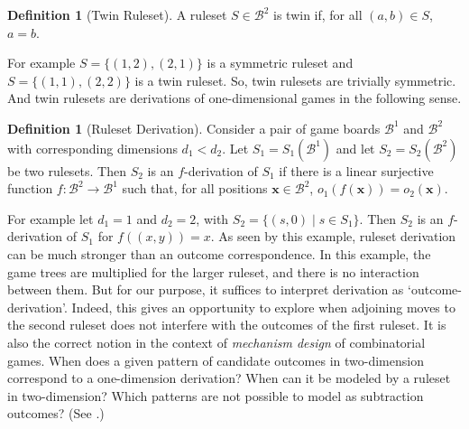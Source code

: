 \documentclass{amsart}
\theoremstyle{plain}
\theoremstyle{definition}
\newtheorem{defi}[thm]{Definition}
\newcommand{\B}{\mathcal B}
\newcommand{\n}{\mathbb N}
\begin{document}
\begin{defi}[Twin Ruleset]
\label{def:twin}
A ruleset $S\in\B^2$ is twin if, for all $(a,b)\in S$, $a=b$. 
\end{defi}
For example $S=\{(1,2),(2,1)\}$ is a symmetric ruleset and $S=\{(1,1),(2,2)\}$ is a twin ruleset. So, twin rulesets are trivially symmetric. And twin rulesets are derivations of one-dimensional games in the following sense. 
\begin{defi}[Ruleset Derivation]
\label{def: Ruleset Derivation}
Consider a pair of game boards $\B^1$ and $\B^2$ with corresponding dimensions $d_1<d_2$. Let $S_1=S_1(\B^1)$ and let $S_2=S_2(\B^2)$ be two rulesets. Then $S_2$ is an $f$-derivation of $S_1$ if there is a linear  surjective function $f:\B^2\rightarrow \B^1$ such that, for all positions $ \boldsymbol x\in \B^2$, $o_1(f(\boldsymbol x))=o_2(\boldsymbol x)$. 
\end{defi}

For example let $d_1=1$ and $d_2=2$,  with $S_2=\{(s,0)\mid s\in S_1\}$. Then $S_2$ is an $f$-derivation of $S_1$ for $f((x,y))=x$. As seen by this example, ruleset derivation can be much stronger than an outcome correspondence. In this example, the game trees are multiplied for the larger ruleset, and there is no interaction between them. But for our purpose, it suffices to interpret derivation as `outcome-derivation'. Indeed, this gives an opportunity to explore when adjoining moves to the second ruleset does not interfere with the outcomes of the first ruleset. It is also the correct notion in the context of {\em mechanism design} of combinatorial games. When does a given pattern of candidate outcomes in {\sc two-dimension} correspond to a {\sc one-dimension} derivation? When can it be modeled by a ruleset in {\sc two-dimension}? Which patterns are not possible to model as {\sc subtraction} outcomes? (See \cite{larsson2013impartial,MR4188748}.)
\end{document}
